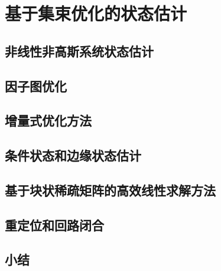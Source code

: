 \chapter{基于集束优化的状态估计}

\section{非线性非高斯系统状态估计}

\section{因子图优化}

\section{增量式优化方法}

\section{条件状态和边缘状态估计}

\section{基于块状稀疏矩阵的高效线性求解方法}

\section{重定位和回路闭合}

\section{小结}
